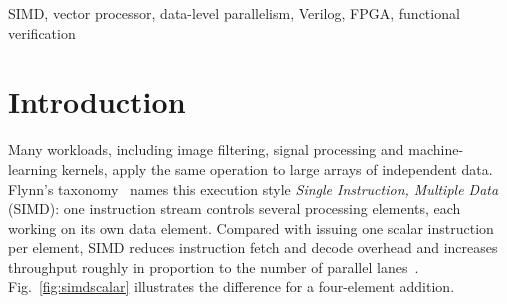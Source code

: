 \documentclass[conference]{IEEEtran}
\begin{document}
\begin{IEEEkeywords}
SIMD, vector processor, data-level parallelism, Verilog, FPGA, functional verification
\end{IEEEkeywords}
\section{Introduction}
Many workloads, including image filtering, signal processing and machine-learning
kernels, apply the same operation to large arrays of independent data. Flynn's
taxonomy~\cite{flynn1972} names this execution style \emph{Single Instruction,
Multiple Data} (SIMD): one instruction stream controls several processing
elements, each working on its own data element. Compared with issuing one scalar
instruction per element, SIMD reduces instruction fetch and decode overhead and
increases throughput roughly in proportion to the number of parallel
lanes~\cite{hennessy2017}. Fig.~\ref{fig:simdscalar} illustrates the difference
for a four-element addition.
\end{document}
